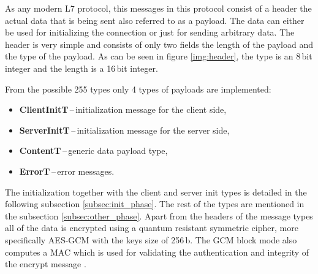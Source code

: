As any modern L7 protocol, this messages in this protocol consist of a header the actual data that is being sent also referred to as a payload. The data can either be used for initializing the connection or just for sending arbitrary data. The header is very simple and consists of only two fields the length of the payload and the type of the payload. As can be seen in figure \ref{img:header}, the type is an 8\,bit integer and the length is a 16\,bit integer.

\noindent From the possible 255 types only 4 types of payloads are implemented:
\begin{itemize}
  \item \textbf{ClientInitT}\,--\,initialization message for the client side,
  \item \textbf{ServerInitT}\,--\,initialization message for the server side,
  \item \textbf{ContentT}\,--\,generic data payload type,
  \item \textbf{ErrorT}\,--\,error messages.
\end{itemize}
The initialization together with the client and server init types is detailed in the following subsection \ref{subsec:init_phase}. The rest of the types are mentioned in the subsection \ref{subsec:other_phase}. Apart from the headers of the message types all of the data is encrypted using a quantum resistant symmetric cipher, more specifically AES-GCM with the keys size of 256\,b. The GCM block mode also computes a MAC which is used for validating the authentication and integrity of the encrypt message \cite{Paar2010}.
